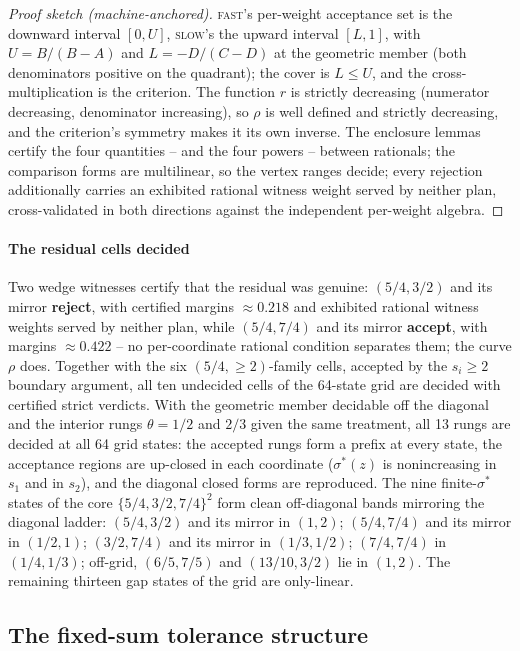 \documentclass[preprint,11pt,authoryear]{elsarticle}
\theoremstyle{remark}
\newcommand{\act}[1]{\textsc{#1}}
\begin{document}
\begin{proof}[Proof sketch (machine-anchored)]
\act{fast}'s per-weight acceptance set is the downward interval $[0,U]$, \act{slow}'s the upward interval $[L,1]$, with $U=B/(B-A)$ and $L=-D/(C-D)$ at the geometric member (both denominators positive on the quadrant); the cover is $L\le U$, and the cross-multiplication is the criterion. The function $r$ is strictly decreasing (numerator decreasing, denominator increasing), so $\rho$ is well defined and strictly decreasing, and the criterion's symmetry makes it its own inverse. The enclosure lemmas certify the four quantities -- and the four powers -- between rationals; the comparison forms are multilinear, so the vertex ranges decide; every rejection additionally carries an exhibited rational witness weight served by neither plan, cross-validated in both directions against the independent per-weight algebra.
\end{proof}

\paragraph{The residual cells decided} Two wedge witnesses certify that the residual was genuine: $(5/4,3/2)$ and its mirror \textbf{reject}, with certified margins $\approx0.218$ and exhibited rational witness weights served by neither plan, while $(5/4,7/4)$ and its mirror \textbf{accept}, with margins $\approx0.422$ -- no per-coordinate rational condition separates them; the curve $\rho$ does. Together with the six $(5/4,\ge2)$-family cells, accepted by the $s_i\ge2$ boundary argument, all ten undecided cells of the 64-state grid are decided with certified strict verdicts. With the geometric member decidable off the diagonal and the interior rungs $\theta=1/2$ and $2/3$ given the same treatment, all 13 rungs are decided at all 64 grid states: the accepted rungs form a prefix at every state, the acceptance regions are up-closed in each coordinate ($\sigma^*(z)$ is nonincreasing in $s_1$ and in $s_2$), and the diagonal closed forms are reproduced. The nine finite-$\sigma^*$ states of the core $\{5/4,3/2,7/4\}^2$ form clean off-diagonal bands mirroring the diagonal ladder: $(5/4,3/2)$ and its mirror in $(1,2)$; $(5/4,7/4)$ and its mirror in $(1/2,1)$; $(3/2,7/4)$ and its mirror in $(1/3,1/2)$; $(7/4,7/4)$ in $(1/4,1/3)$; off-grid, $(6/5,7/5)$ and $(13/10,3/2)$ lie in $(1,2)$. The remaining thirteen gap states of the grid are only-linear.

\subsection{The fixed-sum tolerance structure}
\end{document}
